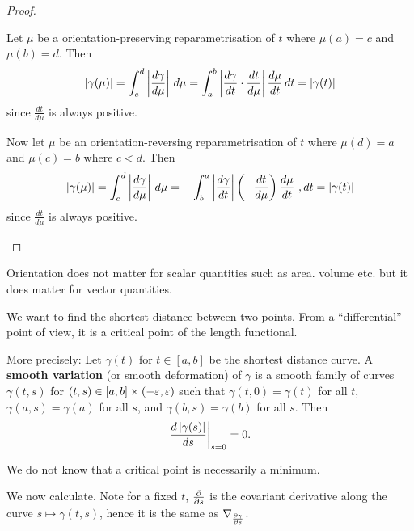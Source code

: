 \begin{proof}
  \lv
  \begin{enum}
    \io
    Let $\mu$ be a orientation-preserving reparametrisation of $t$ where $\mu(a)=c$ and $\mu(b)=d$.
    Then
    \[ \left\lvert \gamma(\mu) \right\rvert = \int_c^d \left\lvert \frac{d\gamma}{d\mu} \right\rvert \, d\mu = \int_a^b \left\lvert \frac{d\gamma}{dt}\cdot\frac{dt}{d\mu} \right\rvert\frac{d\mu}{dt}\, dt = \left\lvert \gamma(t) \right\rvert \]
    since $\tfrac{dt}{d\mu}$ is always positive.

    \io
    Now let $\mu$ be an orientation-reversing reparametrisation of $t$ where $\mu(d)=a$ and $\mu(c)=b$ where $c<d$.
    Then
    \[ \abs{\gamma(\mu)} = \int_c^d \abs{\frac{d\gamma}{d\mu}} \, d\mu = - \int_b^a \abs{\frac{d\gamma}{dt}}\left(-\frac{dt}{d\mu}\right)\frac{d\mu}{dt}\ ,dt = \abs{\gamma(t)} \]
    since $\tfrac{dt}{d\mu}$ is always positive.
  \end{enum}
\end{proof}

\begin{rmk}
  Orientation does not matter for scalar quantities such as area. volume etc. but it does matter for vector quantities.
\end{rmk}

We want to find the shortest distance between two points.
From a ``differential'' point of view, it is a critical point of the length functional.

More precisely:
Let $\gamma(t)$ for $t\in[a,b]$ be the shortest distance curve.
A \textbf{smooth variation} (or smooth deformation) of $\gamma$ is a smooth family of curves $\gamma(t,s)$ for $(t,s) \in [a,b] \times (-\varepsilon,\varepsilon)$ such that $\gamma(t,0)=\gamma(t)$ for all $t$, $\gamma(a,s)=\gamma(a)$ for all $s$, and $\gamma(b,s)=\gamma(b)$ for all $s$.
Then
\[ \frac{d\left\lvert \gamma(s) \right\rvert}{ds}\bigg\vert_{s=0}=0. \]

\begin{rmk}
  We do not know that a critical point is necessarily a minimum.
\end{rmk}

We now calculate.
Note for a fixed $t$, $\tfrac{\partial}{\partial s}$ is the covariant derivative along the curve $s \mapsto \gamma(t,s)$, hence it is the same as $\nabla_{\frac{\partial\gamma}{\partial s}}$.

